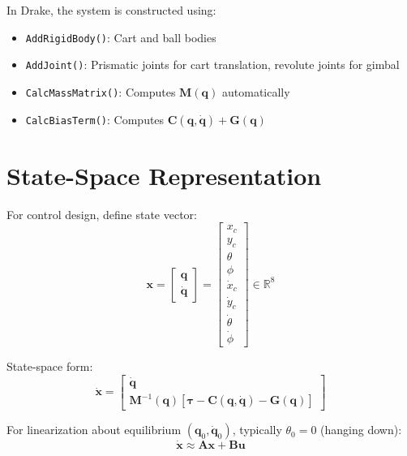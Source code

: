 \documentclass[12pt]{article}
\begin{document}
In Drake, the system is constructed using:
\begin{itemize}
    \item \texttt{AddRigidBody()}: Cart and ball bodies
    \item \texttt{AddJoint()}: Prismatic joints for cart translation, revolute joints for gimbal
    \item \texttt{CalcMassMatrix()}: Computes $\mathbf{M}(\mathbf{q})$ automatically
    \item \texttt{CalcBiasTerm()}: Computes $\mathbf{C}(\mathbf{q},\dot{\mathbf{q}}) + \mathbf{G}(\mathbf{q})$
\end{itemize}

\section{State-Space Representation}

For control design, define state vector:
\begin{equation}
    \mathbf{x} = \begin{bmatrix} \mathbf{q} \\ \dot{\mathbf{q}} \end{bmatrix} = 
    \begin{bmatrix} x_c \\ y_c \\ \theta \\ \phi \\ \dot{x}_c \\ \dot{y}_c \\ \dot{\theta} \\ \dot{\phi} \end{bmatrix}
    \in \mathbb{R}^8
\end{equation}

State-space form:
\begin{equation}
    \dot{\mathbf{x}} = 
    \begin{bmatrix}
        \dot{\mathbf{q}} \\
        \mathbf{M}^{-1}(\mathbf{q})[\boldsymbol{\tau} - \mathbf{C}(\mathbf{q},\dot{\mathbf{q}}) - \mathbf{G}(\mathbf{q})]
    \end{bmatrix}
\end{equation}

For linearization about equilibrium $(\mathbf{q}_0, \dot{\mathbf{q}}_0)$, typically $\theta_0 = 0$ (hanging down):
\begin{equation}
    \dot{\mathbf{x}} \approx \mathbf{A}\mathbf{x} + \mathbf{B}\mathbf{u}
\end{equation}
\end{document}
